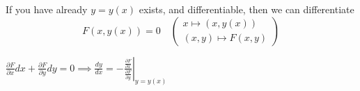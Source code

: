 \begin{remark}
    If you have already $y=y(x)$ exists, and differentiable, then we can differentiate
    $$F(x,y(x))=0\quad(\substack{x\mapsto(x,y(x))\\(x,y)\mapsto F(x,y)})$$

    $\frac{\partial F}{\partial x}dx+\frac{\partial F}{\partial y}dy=0\implies\frac{dy}{dx}=-\left.\frac{\frac{\partial F}{\partial x}}{\frac{\partial F}{\partial y}}\right|_{y=y(x)}$
\end{remark}

